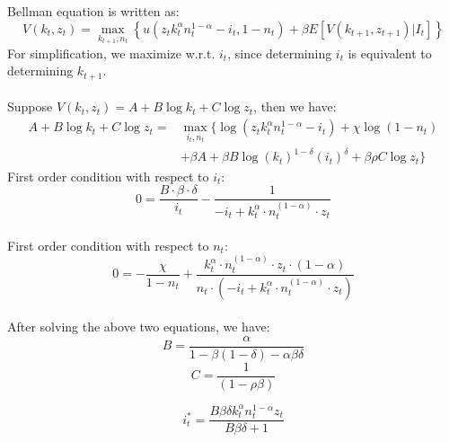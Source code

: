 \documentclass{article}
\begin{document}
\subsection{}
Bellman equation is written as:\\
\begin{equation}
    V(k_t, z_t) = \max_{k_{t+1}, n_t} \left\{ u\left(z_t k_t^\alpha n_t^{1-\alpha}-i_t, 1 - n_t\right) + \beta E[V(k_{t+1}, z_{t+1}) | I_t] \right\}
\end{equation}
For simplification, we maximize w.r.t. \(i_t\), since determining \(i_t\) is equivalent to determining \(k_{t+1}\). \\ \\
Suppose \(V(k_t, z_t) = A + B \log k_t + C \log z_t\), then we have:
\begin{align*}
    A +  B \log k_t + C \log z_t = & \max_{i_{t}, n_t} \{ \log\left(z_t k_t^\alpha n_t^{1-\alpha}-i_t\right) + \chi\log\left( 1 - n_t\right) \\
    &  + \beta A + \beta B \log (k_{t})^{1-\delta}(i_t)^\delta + \beta \rho C \log z_{t} \}
\end{align*}
First order condition with respect to \(i_t\):\\
\begin{equation}
    0 = \frac{{B \cdot \beta \cdot \delta}}{i_t} - \frac{1}{{-i_t + k_t^{\alpha} \cdot n_t^{(1 - \alpha)} \cdot z_t}}
\end{equation}\\
First order condition with respect to \(n_t\):\\
\begin{equation}
    0 = -\frac{{\chi}}{{1 - n_t}} + \frac{{k_t^{\alpha} \cdot n_t^{(1 - \alpha)} \cdot z_t \cdot (1 - \alpha)}}{{n_t \cdot (-i_t + k_t^{\alpha} \cdot n_t^{(1 - \alpha)} \cdot z_t)}}
\end{equation}\\
After solving the above two equations, we have:\\
\begin{equation}
    B = \frac{\alpha}{1-\beta(1-\delta)-\alpha\beta\delta}
\end{equation}
\begin{equation}
    C = \frac{1}{(1-\rho\beta)}
\end{equation}

\begin{equation}
    i_t^* = \frac{B\beta\delta k_t^\alpha n_t^{1 - \alpha}z_t}{B\beta\delta + 1}
\end{equation}
\end{document}
